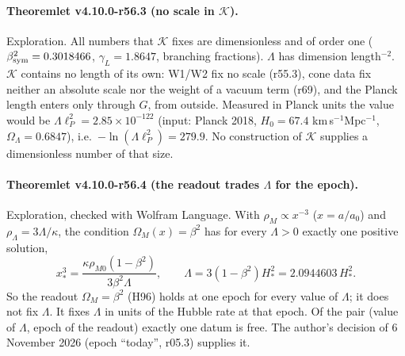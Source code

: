 \paragraph{Theoremlet v4.10.0-r56.3 (no scale in \(\mathcal K\)).}
Exploration.  All numbers that \(\mathcal K\) fixes are dimensionless and of order one (\(\beta_{\rm sym}^2=0.3018466\), \(\gamma_L=1.8647\), branching
fractions).  \(\Lambda\) has dimension length\({}^{-2}\).  \(\mathcal K\) contains no length of its own: W1/W2 fix no scale (r55.3), cone data fix neither an absolute
scale nor the weight of a vacuum term (r69), and the Planck length enters only through \(G\), from outside.  Measured in Planck units the value
would be \(\Lambda\ell_P^2=2.85\times10^{-122}\) (input: Planck 2018, \(H_0=67.4\) km\,s\(^{-1}\)Mpc\(^{-1}\), \(\Omega_\Lambda=0.6847\)), i.e.\ \(-\ln(\Lambda\ell_P^2)=279.9\).
No construction of \(\mathcal K\) supplies a dimensionless number of that size.

\paragraph{Theoremlet v4.10.0-r56.4 (the readout trades \(\Lambda\) for the epoch).}
Exploration, checked with Wolfram Language.  With \(\rho_M\propto x^{-3}\) (\(x=a/a_0\)) and \(\rho_\Lambda=3\Lambda/\kappa\), the condition \(\Omega_M(x)=\beta^2\) has for every
\(\Lambda>0\) exactly one positive solution,
\[
x_*^3=\frac{\kappa\rho_{M0}(1-\beta^2)}{3\beta^2\Lambda},\qquad \Lambda=3(1-\beta^2)H_*^2=2.0944603\,H_*^2 .
\]
So the readout \(\Omega_M=\beta^2\) (H96) holds at one epoch for every value of \(\Lambda\); it does not fix \(\Lambda\).  It fixes \(\Lambda\) in units of the Hubble
rate at that epoch.  Of the pair (value of \(\Lambda\), epoch of the readout) exactly one datum is free.  The author's decision of 6 November 2026
(epoch ``today'', r05.3) supplies it.

